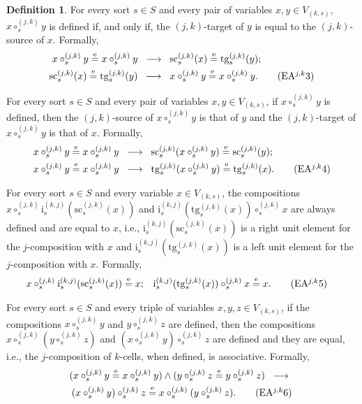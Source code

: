 \documentclass[a4paper, reqno]{amsbook}
\newcommand{\eeq}{\overset{\mathrm e}{=}}      %
\newcommand{\src}{\mathrm{sc}}
\newcommand{\tgt}{\mathrm{tg}}
\theoremstyle{plain}
\theoremstyle{definition}
\newtheorem{definition}[theorem]{Definition}
\begin{document}
\begin{definition}
For every sort $s\in S$ and every pair of variables $x,y\in V_{(k,s)}$, $x\circ^{(j,k)}_{s} y$ is defined if, and only if, the $(j,k)$-target of $y$ is equal to the $(j,k)$-source of $x$.
Formally,
\begin{align*}
x\circ^{(j,k)}_{s} y\eeq x\circ^{(j,k)}_{s} y \;\;
&\longrightarrow \;\;
\src^{(j,k)}_{s}(x)\eeq\tgt^{(j,k)}_{s}(y);\\
\src^{(j,k)}_{s}(x)\eeq\tgt^{(j,k)}_{s}(y) \;\;
&\longrightarrow \;\;
x\circ^{(j,k)}_{s} y\eeq x\circ^{(j,k)}_{s}y.\label{ACatHtgEAjk3}\tag{EA$^{j,k}$3}
\end{align*}

For every sort $s\in S$ and every pair of variables $x,y\in V_{(k,s)}$, if $x\circ^{(j,k)}_{s} y$ is defined, then the $(j,k)$-source of $x\circ^{(j,k)}_{s}y$ is that of $y$ and the $(j,k)$-target of $x\circ^{(j,k)}_{s}y$ is that of $x$.
Formally,
\begin{align*}
x\circ^{(j,k)}_{s}y\eeq x\circ^{(j,k)}_{s}y \;\;
&\longrightarrow \;\;
\src^{(j,k)}_{s}(x\circ^{(j,k)}_{s}y)\eeq\src^{(j,k)}_{s}(y);\\
x\circ^{(j,k)}_{s}y\eeq x\circ^{(j,k)}_{s}y \;\;
&\longrightarrow \;\;
\tgt^{(j,k)}_{s}(x\circ^{(j,k)}_{s}y)\eeq\tgt^{(j,k)}_{s}(x).\label{ACatHtgEAjk4}\tag{EA$^{j,k}$4}
\end{align*}

For every sort $s\in S$ and every variable $x\in V_{(k,s)}$, the compositions $x\circ^{(j,k)}_{s}\mathrm{i}^{(k,j)}_{s}(\src^{(j,k)}_{s}(x))$ and $\mathrm{i}^{(k,j)}_{s}(\tgt^{(j,k)}_{s}(x))\circ^{(j,k)}_{s}x$ are always defined and are equal to $x$, i.e., $\mathrm{i}^{(k,j)}_{s}(\src^{(j,k)}_{s}(x))$ is a right unit element for the $j$-composition with $x$ and $\mathrm{i}^{(k,j)}_{s}(\tgt^{(j,k)}_{s}(x))$ is a left unit element for the $j$-composition with $x$.
Formally,
\begin{align*}
x\circ^{(j,k)}_{s}\mathrm{i}^{(k,j)}_{s}(\src^{(j,k)}_{s}(x))&\eeq x;
&
\mathrm{i}^{(k,j)}_{s}(\tgt^{(j,k)}_{s}(x))\circ^{(j,k)}_{s}x&\eeq x.\label{ACatHtgEAjk5}\tag{EA$^{j,k}$5}
\end{align*}

For every sort $s\in S$ and every triple of variables $x, y, z\in V_{(k,s)}$, if the compositions $x\circ^{(j,k)}_{s}y$ and $y\circ^{(j,k)}_{s}z$ are defined, then the compositions $x\circ^{(j,k)}_{s}(y\circ^{(j,k)}_{s}z)$ and $(x\circ^{(j,k)}_{s}y)\circ^{(j,k)}_{s}z$ are defined and they are equal, i.e., the $j$-composition of $k$-cells, when defined, is associative.
Formally,
\begin{multline*}
(x\circ^{(j,k)}_{s}y\eeq x\circ^{(j,k)}_{s}y)
\wedge
(y\circ^{(j,k)}_{s}z\eeq y\circ^{(j,k)}_{s}z)\;\;
\longrightarrow \;\;\\
(x\circ^{(j,k)}_{s}y)\circ^{(j,k)}_{s}z\eeq x\circ^{(j,k)}_{s}(y\circ^{(j,k)}_{s}z).\label{ACatHtgEAjk6}\tag{EA$^{j,k}$6}
\end{multline*}


\end{definition}
\end{document}
